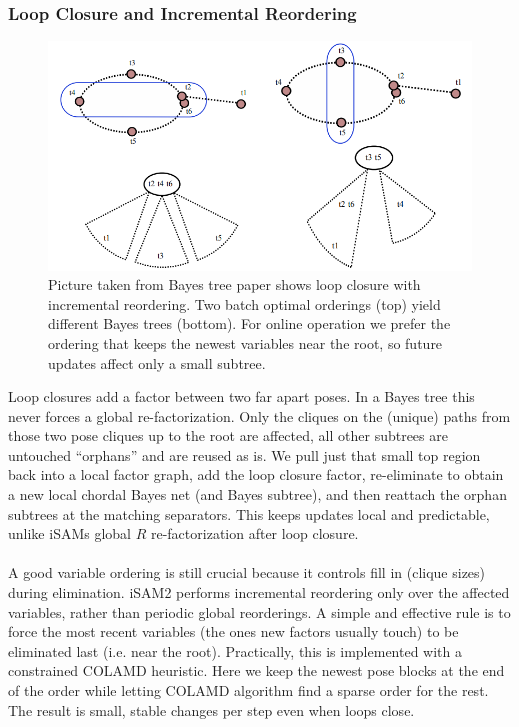\subsubsection{Loop Closure and Incremental Reordering}
\begin{figure}[H]
    \centering
    \includegraphics[width=0.98\linewidth]{Pictures/Optimizers/iSAM2/incremental_reordering.png}
    \caption{Picture taken from Bayes tree paper \cite{Bayes_tree_for_SLAM_paper} shows loop closure with incremental reordering. Two batch optimal orderings (top) yield different Bayes trees (bottom). For online operation we prefer the ordering that keeps the newest variables near the root, so future updates affect only a small subtree.}
    \label{fig:optimizer-iSAM2-incremental-reordering}
\end{figure}
\noindent
Loop closures add a factor between two far apart poses. In a Bayes tree this never forces a global re-factorization. Only the cliques on the (unique) paths from those two pose cliques up to the root are affected, all other subtrees are untouched ``orphans'' and are reused as is. We pull just that small top region back into a local factor graph, add the loop closure factor, re-eliminate to obtain a new local chordal Bayes net (and Bayes subtree), and then reattach the orphan subtrees at the matching separators. This keeps updates local and predictable, unlike \gls{iSAM}s global $R$ re-factorization after loop closure. \cite{iSAM2_paper,Bayes_tree_for_SLAM_paper}
\\ \\
A good variable ordering is still crucial because it controls fill in (clique sizes) during elimination. \gls{iSAM}2 performs incremental reordering only over the affected variables, rather than periodic global reorderings. A simple and effective rule is to force the most recent variables (the ones new factors usually touch) to be eliminated last (i.e. near the root). Practically, this is implemented with a constrained \gls{COLAMD} heuristic. Here we keep the newest pose blocks at the end of the order while letting \gls{COLAMD} algorithm find a sparse order for the rest. The result is small, stable changes per step even when loops close. \cite{Bayes_tree_for_SLAM_paper}

